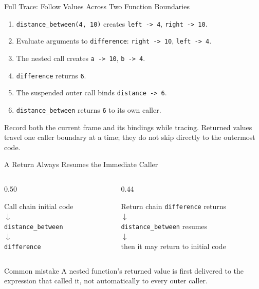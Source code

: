 \documentclass[aspectratio=169,10pt]{beamer}
\begin{document}
\begin{frame}{Full Trace: Follow Values Across Two Function Boundaries}
  \begin{enumerate}
    \item \texttt{distance\_between(4, 10)} creates \texttt{left -> 4}, \texttt{right -> 10}.
    \item Evaluate arguments to \texttt{difference}: \texttt{right -> 10}, \texttt{left -> 4}.
    \item The nested call creates \texttt{a -> 10}, \texttt{b -> 4}.
    \item \texttt{difference} returns \texttt{6}.
    \item The suspended outer call binds \texttt{distance -> 6}.
    \item \texttt{distance\_between} returns \texttt{6} to its own caller.
  \end{enumerate}

  \begin{keyidea}
    Record both the current frame and its bindings while tracing. Returned values travel one caller boundary at a time; they do not skip directly to the outermost code.
  \end{keyidea}
\end{frame}

\begin{frame}{A Return Always Resumes the Immediate Caller}
  \begin{columns}[T,onlytextwidth]
    \begin{column}{0.50\textwidth}
      \begin{block}{Call chain}
        initial code\\
        $\downarrow$\\
        \texttt{distance\_between}\\
        $\downarrow$\\
        \texttt{difference}
      \end{block}
    \end{column}

    \begin{column}{0.44\textwidth}
      \begin{block}{Return chain}
        \texttt{difference} returns\\
        $\downarrow$\\
        \texttt{distance\_between} resumes\\
        $\downarrow$\\
        then it may return to initial code
      \end{block}
    \end{column}
  \end{columns}

  \begin{alertblock}{Common mistake}
    A nested function's returned value is first delivered to the expression that called it, not automatically to every outer caller.
  \end{alertblock}
\end{frame}
\end{document}
